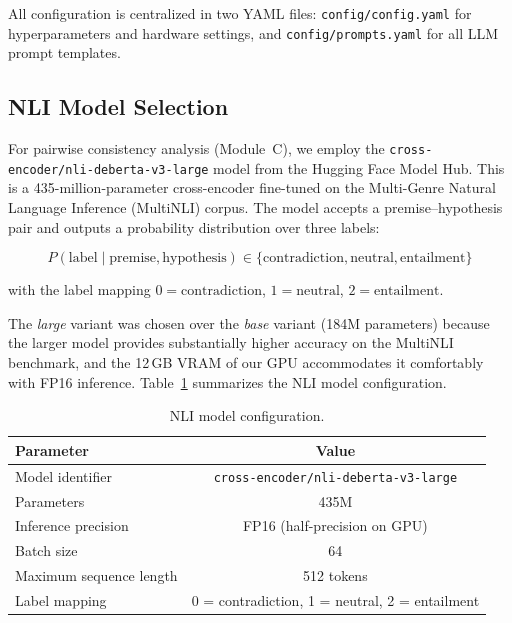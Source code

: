 All configuration is centralized in two YAML files: \texttt{config/config.yaml} for hyperparameters and hardware settings, and \texttt{config/prompts.yaml} for all LLM prompt templates.

\subsection{NLI Model Selection}
\label{sec:nli-model}

For pairwise consistency analysis (Module~C), we employ the \texttt{cross-encoder/nli-deberta-v3-large} model from the Hugging Face Model Hub. This is a 435-million-parameter cross-encoder fine-tuned on the Multi-Genre Natural Language Inference (MultiNLI) corpus. The model accepts a premise--hypothesis pair and outputs a probability distribution over three labels:

\begin{equation}
    P(\text{label} \mid \text{premise}, \text{hypothesis}) \in \{\text{contradiction}, \text{neutral}, \text{entailment}\}
    \label{eq:nli-output}
\end{equation}

\noindent with the label mapping $0 = \text{contradiction}$, $1 = \text{neutral}$, $2 = \text{entailment}$.

The \emph{large} variant was chosen over the \emph{base} variant (184M parameters) because the larger model provides substantially higher accuracy on the MultiNLI benchmark, and the 12\,GB VRAM of our GPU accommodates it comfortably with FP16 inference. Table~\ref{tab:nli-config} summarizes the NLI model configuration.

\begin{table}[!htbp]
    \centering
    \caption{NLI model configuration.}
    \label{tab:nli-config}
    \begin{tabular}{lc}
        \toprule
        \textbf{Parameter} & \textbf{Value} \\
        \midrule
        Model identifier         & \texttt{cross-encoder/nli-deberta-v3-large} \\
        Parameters               & 435M \\
        Inference precision      & FP16 (half-precision on GPU) \\
        Batch size               & 64 \\
        Maximum sequence length  & 512 tokens \\
        Label mapping            & 0 = contradiction, 1 = neutral, 2 = entailment \\
        \bottomrule
    \end{tabular}
\end{table}

